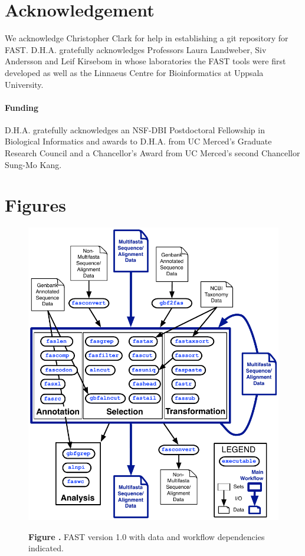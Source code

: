 \documentclass{frontiersSCNS} %
\begin{document}
\section*{Acknowledgement}
We acknowledge Christopher Clark for help in establishing a git
repository for FAST. D.H.A. gratefully acknowledges Professors Laura
Landweber, Siv Andersson and Leif Kirsebom in whose laboratories the
FAST tools were first developed as well as the Linnaeus Centre for
Bioinformatics at Uppsala University.

\paragraph{Funding\textcolon} D.H.A. gratefully acknowledges an NSF-DBI
Postdoctoral Fellowship in Biological Informatics and awards to
D.H.A. from UC Merced's Graduate Research Council and a Chancellor's
Award from UC Merced's second Chancellor Sung-Mo Kang.



\section*{Figures}

\begin{figure}
\begin{center}
\includegraphics[width=4.5in]{FAST_v7}%
\end{center}
 \textbf{\label{fig:01} Figure
   .}{ FAST version 1.0 with data and workflow
   dependencies indicated.}
\end{figure}
\end{document}
